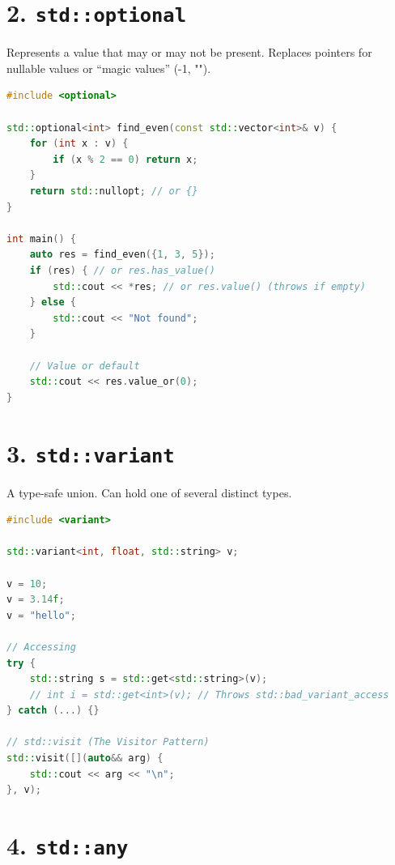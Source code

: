 \hypertarget{stdoptional}{%
\section{\texorpdfstring{2.
\texttt{std::optional}}{2. std::optional}}\label{stdoptional}}

Represents a value that may or may not be present. Replaces pointers for
nullable values or ``magic values'' (-1, "").

\begin{lstlisting}[language={C++}]
#include <optional>

std::optional<int> find_even(const std::vector<int>& v) {
    for (int x : v) {
        if (x % 2 == 0) return x;
    }
    return std::nullopt; // or {}
}

int main() {
    auto res = find_even({1, 3, 5});
    if (res) { // or res.has_value()
        std::cout << *res; // or res.value() (throws if empty)
    } else {
        std::cout << "Not found";
    }
    
    // Value or default
    std::cout << res.value_or(0); 
}
\end{lstlisting}

\hypertarget{stdvariant}{%
\section{\texorpdfstring{3.
\texttt{std::variant}}{3. std::variant}}\label{stdvariant}}

A type-safe union. Can hold one of several distinct types.

\begin{lstlisting}[language={C++}]
#include <variant>

std::variant<int, float, std::string> v;

v = 10;
v = 3.14f;
v = "hello";

// Accessing
try {
    std::string s = std::get<std::string>(v);
    // int i = std::get<int>(v); // Throws std::bad_variant_access
} catch (...) {}

// std::visit (The Visitor Pattern)
std::visit([](auto&& arg) {
    std::cout << arg << "\n";
}, v);
\end{lstlisting}

\hypertarget{stdany}{%
\section{\texorpdfstring{4.
\texttt{std::any}}{4. std::any}}\label{stdany}}

